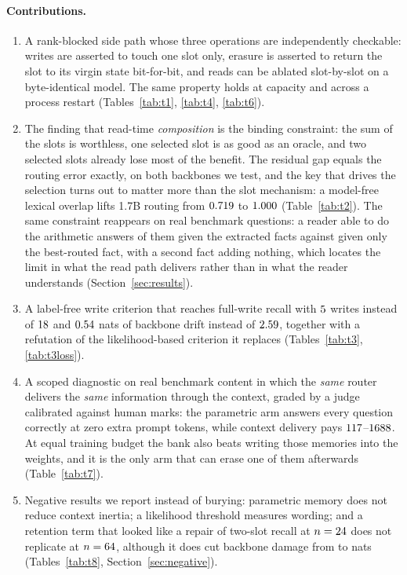 \documentclass[11pt]{article}
\begin{document}
\paragraph{Contributions.}
\begin{enumerate}\itemsep2pt
\item A rank-blocked side path whose three operations are independently checkable:
  writes are asserted to touch one slot only, erasure is asserted to return the slot
  to its virgin state bit-for-bit, and reads can be ablated slot-by-slot on a
  byte-identical model. The same property holds at capacity and across a process
  restart (Tables~\ref{tab:t1}, \ref{tab:t4}, \ref{tab:t6}).
\item The finding that read-time \emph{composition} is the binding constraint: the sum
  of the slots is worthless, one selected slot is as good as an oracle, and two
  selected slots already lose most of the benefit. The residual gap equals the routing
  error exactly, on both backbones we test, and the key that drives the selection turns
  out to matter more than the slot mechanism: a model-free lexical overlap lifts 1.7B
  routing from $0.719{}$ to $1.000{}$ (Table~\ref{tab:t2}). The same
  constraint reappears on real benchmark questions: a reader able to do the arithmetic answers
  \tHostedContext{} of them given the extracted facts against \tHostedTopOne{} given only the
  best-routed fact, with a second fact adding nothing, which locates the limit in what the read
  path delivers rather than in what the reader understands (Section~\ref{sec:results}).
\item A label-free write criterion that reaches full-write recall with
  $5$ writes instead of $18$ and $0.54$ nats of backbone
  drift instead of $2.59$, together with a refutation of the likelihood-based
  criterion it replaces (Tables~\ref{tab:t3}, \ref{tab:t3loss}).
\item A scoped diagnostic on real benchmark content in which the \emph{same} router
  delivers the \emph{same} information through the context, graded by a judge
  calibrated against human marks: the parametric arm answers every question correctly
  at zero extra prompt tokens, while context delivery pays
  $117{}$--$1688{}$. At equal training budget the bank also
  beats writing those memories into the weights, and it is the only arm that can erase
  one of them afterwards (Table~\ref{tab:t7}).
\item Negative results we report instead of burying: parametric memory does not reduce
  context inertia; a likelihood threshold measures wording; and a retention term that
  looked like a repair of two-slot recall at $n = 24{}$ does not
  replicate at $n = 64{}$, although it does cut backbone damage from
  \tRetentionKlBase{} to \tRetentionKlBest{} nats
  (Tables~\ref{tab:t8}, Section~\ref{sec:negative}).
\end{enumerate}
\end{document}
